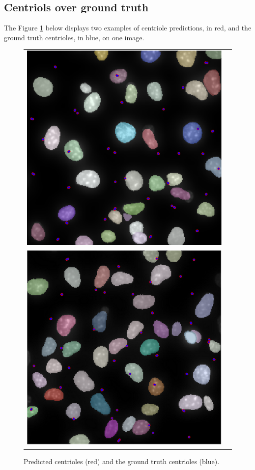 \documentclass[9pt,conference,compsocconf, article]{IEEEtran}
\begin{document}
\subsection{Centriols over ground truth}
The Figure \ref{fig:cen_gt} below displays two examples of centriole predictions, in red, and the ground truth centrioles, in blue, on one image.
\begin{figure}[h!]
    \centering
    \begin{tabular}{cc}
        \includegraphics[width=0.65\linewidth]{images/GTonPred.png}
        \\
        \includegraphics[width=0.65\linewidth]{images/GT2.PNG}
        
    \end{tabular}
    \caption{
    Predicted centrioles (red) and the ground truth centrioles (blue).
    }
    \label{fig:cen_gt}
\end{figure}
\end{document}
